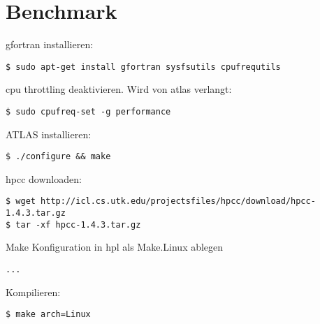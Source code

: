 \chapter{Benchmark}
gfortran installieren:
\begin{lstlisting}[style=Bash]
$ sudo apt-get install gfortran sysfsutils cpufrequtils
\end{lstlisting}
cpu throttling deaktivieren. Wird von atlas verlangt:
\begin{lstlisting}[style=Bash]
$ sudo cpufreq-set -g performance
\end{lstlisting}
ATLAS installieren:
\begin{lstlisting}[style=Bash]
$ ./configure && make
\end{lstlisting}
hpcc downloaden:
\begin{lstlisting}[style=Bash]
$ wget http://icl.cs.utk.edu/projectsfiles/hpcc/download/hpcc-1.4.3.tar.gz
$ tar -xf hpcc-1.4.3.tar.gz
\end{lstlisting}
Make Konfiguration in hpl als Make.Linux ablegen
\begin{lstlisting}[style=Bash]
...
\end{lstlisting}
Kompilieren:
\begin{lstlisting}[style=Bash]
$ make arch=Linux
\end{lstlisting}
